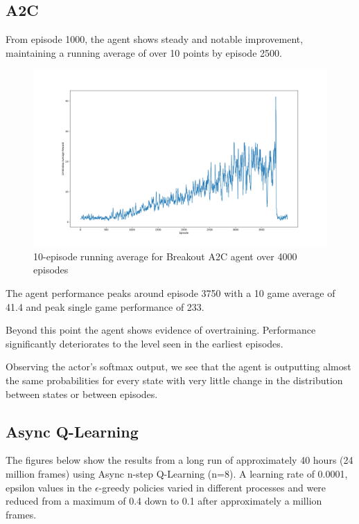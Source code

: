 \documentclass{article}
\begin{document}
\subsection{A2C}
From episode 1000, the agent shows steady and notable improvement, maintaining a running average of over 10 points by episode 2500.

\begin{figure}
\centering
\captionsetup{width=.8\linewidth}
\vspace*{-1cm}
\includegraphics[width=.98\linewidth]{A2C4000.png}
\caption{10-episode running average for Breakout A2C agent over 4000 episodes}
\end{figure}

The agent performance peaks around episode 3750 with a 10 game average of 41.4 and peak single game performance of 233.

 Beyond this point the agent shows evidence of overtraining. Performance significantly deteriorates to the level seen in the earliest episodes.

 Observing the actor's softmax output, we see that the agent is outputting almost the same probabilities for every state with very little change in the distribution between states or between episodes.

\subsection{Async Q-Learning}
The figures below show the results from a long run of approximately 40 hours (24 million frames) using Async n-step Q-Learning (n=8). A learning rate of 0.0001, epsilon values in the $\epsilon$-greedy policies varied in different processes and were reduced from a maximum of 0.4 down to 0.1 after approximately a million frames.
\end{document}
